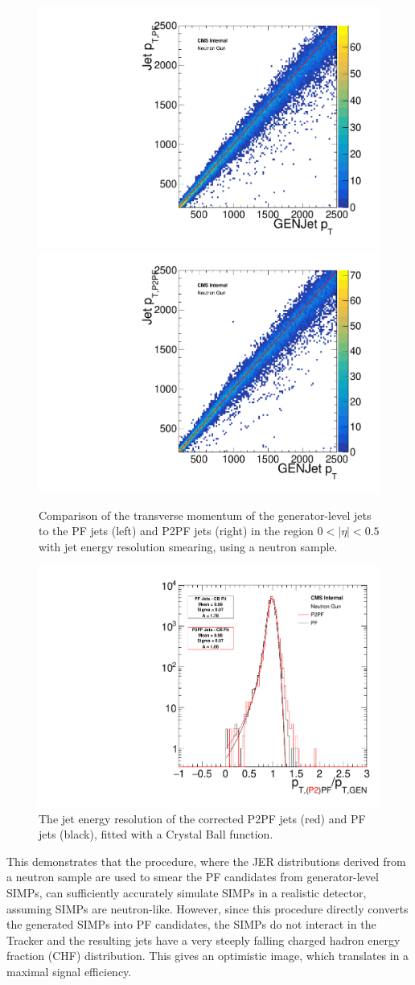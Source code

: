 \begin{figure}[ht]
  \centering
 \includegraphics[width=.48\textwidth]{pt_neutron_gun_th2f_005.pdf} \hfill
\includegraphics[width=.48\textwidth]{pt_neutron_gun_p2pf_th2f_005.pdf}
 \caption{Comparison of the transverse momentum of the generator-level jets to the \ac{PF} jets (left) and P2PF jets (right) in the region $0< |\eta| < 0.5$ with jet energy resolution smearing, using a neutron sample.}
 \label{fig:neutron_corr}
\end{figure}

\begin{figure}[ht]
  \centering
 \includegraphics[width=.75\textwidth]{pt_neutron_gun_res_fit_005.pdf} 
 \caption{The jet energy resolution of the corrected P2PF jets (red) and \ac{PF} jets (black), fitted with a Crystal Ball function.}
 \label{fig:neutron_res_corr}
\end{figure}

This demonstrates that the procedure, where the \ac{JER} distributions derived from a neutron sample are used to smear the \ac{PF} candidates from generator-level \acp{SIMP}, can sufficiently accurately simulate \acp{SIMP} in a realistic detector, assuming \acp{SIMP} are neutron-like. However, since this procedure directly converts the generated \acp{SIMP} into \ac{PF} candidates, the \acp{SIMP} do not interact in the Tracker and the resulting jets have a very steeply falling charged hadron energy fraction (CHF) distribution. This gives an optimistic image, which translates in a maximal signal efficiency.

